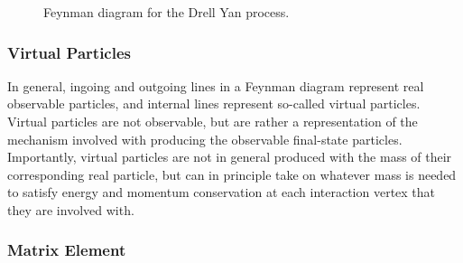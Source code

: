 \begin{figure}[h]
	\centering
	\caption{Feynman diagram for the Drell Yan process.}
	\label{fig:drell_yan}
\end{figure}

\subsubsection{Virtual Particles}
\label{sec:virtual_particles}

In general, ingoing and outgoing lines in a Feynman diagram represent real observable particles, and internal lines represent so-called virtual particles. Virtual particles are not observable, but are rather a representation of the mechanism involved with producing the observable final-state particles. Importantly, virtual particles are not in general produced with the mass of their corresponding real particle, but can in principle take on whatever mass is needed to satisfy energy and momentum conservation at each interaction vertex that they are involved with. 

\subsubsection{Matrix Element}


